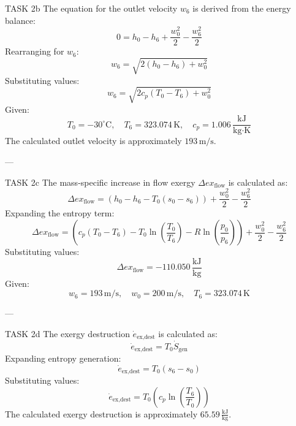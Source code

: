 TASK 2b  
The equation for the outlet velocity \( w_6 \) is derived from the energy balance:  
\[
0 = h_0 - h_6 + \frac{w_0^2}{2} - \frac{w_6^2}{2}
\]  
Rearranging for \( w_6 \):  
\[
w_6 = \sqrt{2(h_0 - h_6) + w_0^2}
\]  
Substituting values:  
\[
w_6 = \sqrt{2 c_p (T_0 - T_6) + w_0^2}
\]  
Given:  
\[
T_0 = -30^\circ\text{C}, \quad T_6 = 323.074 \, \text{K}, \quad c_p = 1.006 \, \frac{\text{kJ}}{\text{kg·K}}
\]  
The calculated outlet velocity is approximately \( 193 \, \text{m/s} \).

---

TASK 2c  
The mass-specific increase in flow exergy \( \Delta ex_{\text{flow}} \) is calculated as:  
\[
\Delta ex_{\text{flow}} = (h_0 - h_6 - T_0(s_0 - s_6)) + \frac{w_0^2}{2} - \frac{w_6^2}{2}
\]  
Expanding the entropy term:  
\[
\Delta ex_{\text{flow}} = (c_p(T_0 - T_6) - T_0 \ln\left(\frac{T_0}{T_6}\right) - R \ln\left(\frac{p_0}{p_6}\right)) + \frac{w_0^2}{2} - \frac{w_6^2}{2}
\]  
Substituting values:  
\[
\Delta ex_{\text{flow}} = -110.050 \, \frac{\text{kJ}}{\text{kg}}
\]  
Given:  
\[
w_6 = 193 \, \text{m/s}, \quad w_0 = 200 \, \text{m/s}, \quad T_6 = 323.074 \, \text{K}
\]  

---

TASK 2d  
The exergy destruction \( \dot{e}_{\text{ex,dest}} \) is calculated as:  
\[
\dot{e}_{\text{ex,dest}} = T_0 \dot{S}_{\text{gen}}
\]  
Expanding entropy generation:  
\[
\dot{e}_{\text{ex,dest}} = T_0 (s_6 - s_0)
\]  
Substituting values:  
\[
\dot{e}_{\text{ex,dest}} = T_0 \left(c_p \ln\left(\frac{T_6}{T_0}\right)\right)
\]  
The calculated exergy destruction is approximately \( 65.59 \, \frac{\text{kJ}}{\text{kg}} \).
